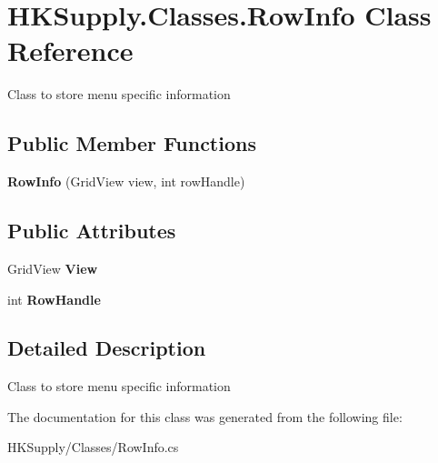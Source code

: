 \hypertarget{class_h_k_supply_1_1_classes_1_1_row_info}{}\section{H\+K\+Supply.\+Classes.\+Row\+Info Class Reference}
\label{class_h_k_supply_1_1_classes_1_1_row_info}


Class to store menu specific information  


\subsection*{Public Member Functions}
\begin{DoxyCompactItemize}
\item 
\mbox{\label{class_h_k_supply_1_1_classes_1_1_row_info_a4a5213a80808716e97c62e2f59803982}} 
{\bfseries Row\+Info} (Grid\+View view, int row\+Handle)
\end{DoxyCompactItemize}
\subsection*{Public Attributes}
\begin{DoxyCompactItemize}
\item 
\mbox{\label{class_h_k_supply_1_1_classes_1_1_row_info_a0636e6e0272971a7d0b46b8f0ab03389}} 
Grid\+View {\bfseries View}
\item 
\mbox{\label{class_h_k_supply_1_1_classes_1_1_row_info_ade87f409f42147d2e9d918a46b4a9898}} 
int {\bfseries Row\+Handle}
\end{DoxyCompactItemize}


\subsection{Detailed Description}
Class to store menu specific information 



The documentation for this class was generated from the following file\+:\begin{DoxyCompactItemize}
\item 
H\+K\+Supply/\+Classes/Row\+Info.\+cs\end{DoxyCompactItemize}
